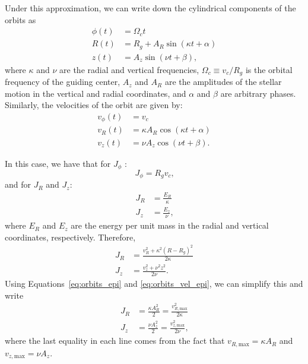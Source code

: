 \documentclass[twocolumn]{aastex62}
\newcommand{\beq}{\begin{equation}}
\newcommand{\eeq}{\end{equation}}
\begin{document}
Under this approximation, we can write down the cylindrical components
of the orbits as
\beq\label{eq:orbits_epi}
\begin{split}
\phi(t) &= \Omega_c t \\
R(t) &= R_g + A_R \sin{(\kappa t + \alpha)} \\
z(t) &= A_z \sin{(\nu t + \beta)}
\text{,}
\end{split}
\eeq
where $\kappa$ and $\nu$ are the radial and vertical frequencies, $\Omega_c
\equiv v_c/R_g$ is the orbital frequency of the guiding center, $A_z$ and $A_R$ are the amplitudes of
the stellar motion in the vertical and radial coordinates, and $\alpha$ and
$\beta$ are arbitrary phases. Similarly, the velocities of the orbit are
given by:
\beq\label{eq:orbits_vel_epi}
\begin{split}
v_{\phi}(t) &= v_c \\
v_R(t) &= \kappa A_R \cos{(\kappa t + \alpha)} \\
v_z(t) &= \nu A_z \cos{(\nu t + \beta)}
\text{.}
\end{split}
\eeq

In this case, we have that for $J_{\phi}$
\citep[][Section~3.5.3b]{2008gady.book.....B}:
\beq\label{eq:Jphi_epi}
J_{\phi} = R_g v_c\text{,}
\eeq
and for $J_R$ and $J_z$:
\beq\label{eq:JR_Jz_epi}
\begin{split}
J_R &= \frac{E_R}{\kappa} \\
J_z &= \frac{E_z}{\nu} \text{,}
\end{split}
\eeq
where $E_R$ and $E_z$ are the energy per unit mass in the radial and vertical
coordinates, respectively. Therefore,
\beq\label{eq:JR_Jz_epi_energy}
\begin{split}
J_R &= \frac{v_R^2 + \kappa^2 (R-R_g)^2}{2\kappa} \\
J_z &= \frac{v_z^2 + \nu^2 z^2}{2\nu}\text{.}
\end{split}
\eeq
Using Equations~\eqref{eq:orbits_epi} and \eqref{eq:orbits_vel_epi}, we can
simplify this and write
\beq\label{eq:JR_Jz_epi_final}
\begin{split}
J_R &= \frac{\kappa A_R^2}{2} = \frac{v_{R,\text{max}}^2}{2\kappa} \\
J_z &= \frac{\nu A_z^2}{2} = \frac{v_{z,\text{max}}^2}{2\nu}\text{,}
\end{split}
\eeq
where the last equality in each line comes from the fact that
$v_{R,\text{max}} = \kappa A_R$ and $v_{z,\text{max}} = \nu A_z$.
\end{document}
